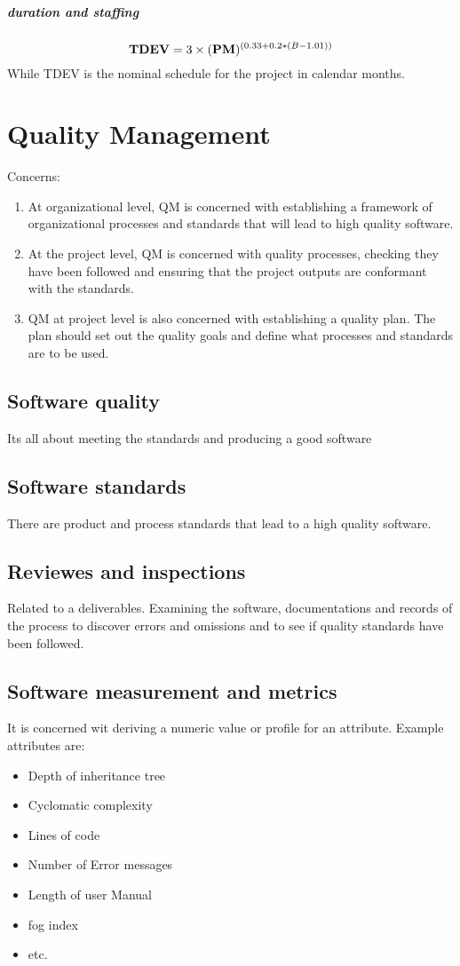 \documentclass[a4paper,11pt,twocolumn]{report}
\begin{document}
\begin{description}
    \paragraph{duration and staffing}
    \[\mbox{\textbf{TDEV}}=3\times (\mbox{\textbf{PM}})^{(0.33+0.2*(B-1.01))}\]
    While TDEV is the nominal schedule for the project in calendar months.

    \chapter{Quality Management}
    Concerns:
    \begin{enumerate}
        \item At organizational level, QM is concerned with establishing a
            framework of organizational processes and standards that will lead
            to high quality software.
        \item At the project level, QM is concerned with quality processes,
            checking they have been followed and ensuring that the project
            outputs are conformant with the standards.
        \item QM at project level is also concerned with establishing a quality
            plan. The plan should set out the quality goals and define what
            processes and standards are to be used.
    \end{enumerate}
    \section{Software quality}
    Its all about meeting the standards and producing a good software
    \section{Software standards}
    There are product and process standards that lead to a high quality
    software.
    \section{Reviewes and inspections}
    Related to a deliverables. Examining the software, documentations and
    records of the process to discover errors and omissions and to see if
    quality standards have been followed.
    \section{Software measurement and metrics}
    It is concerned wit deriving a numeric value or profile for an attribute.
    Example attributes are:
    \begin{itemize}
        \item Depth of inheritance tree
        \item Cyclomatic complexity
        \item Lines of code
        \item Number of Error messages
        \item Length of user Manual
        \item fog index
        \item etc.
    \end{itemize}
    


\end{description}
\end{document}
